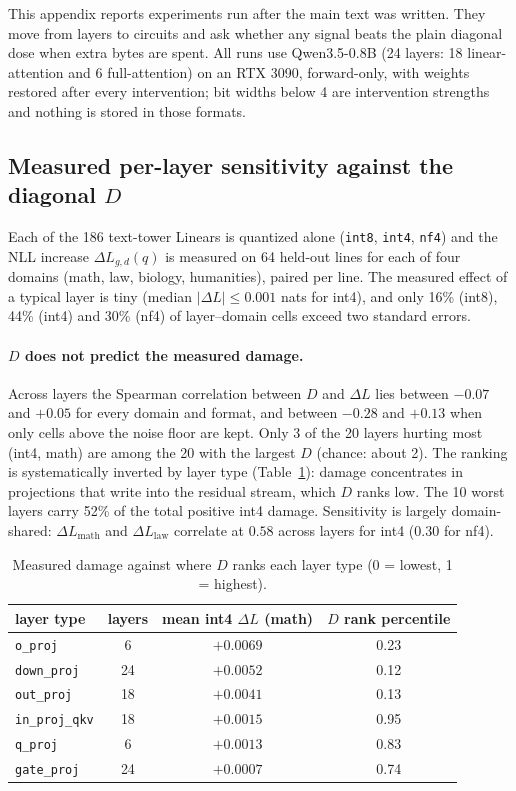 \documentclass[11pt]{article}
\newcommand{\code}[1]{\texttt{#1}}
\begin{document}
This appendix reports experiments run after the main text was written. They move from layers to circuits and ask
whether any signal beats the plain diagonal dose when extra bytes are spent. All runs use Qwen3.5-0.8B
(24 layers: 18 linear-attention and 6 full-attention) on an RTX 3090, forward-only, with weights restored after every
intervention; bit widths below 4 are intervention strengths and nothing is stored in those formats.

\subsection{Measured per-layer sensitivity against the diagonal $D$}
Each of the 186 text-tower Linears is quantized alone (\code{int8}, \code{int4}, \code{nf4}) and the NLL increase
$\Delta L_{g,d}(q)$ is measured on 64 held-out lines for each of four domains (math, law, biology, humanities), paired per line.
The measured effect of a typical layer is tiny (median $|\Delta L|\le 0.001$ nats for int4), and only 16\% (int8), 44\% (int4) and 30\% (nf4)
of layer--domain cells exceed two standard errors.

\paragraph{$D$ does not predict the measured damage.}
Across layers the Spearman correlation between $D$ and $\Delta L$ lies between $-0.07$ and $+0.05$ for every
domain and format, and between $-0.28$ and $+0.13$ when only cells above the noise floor are kept. Only 3 of the 20 layers
hurting most (int4, math) are among the 20 with the largest $D$ (chance: about 2). The ranking is systematically inverted by layer type
(Table~\ref{tab:layertype}): damage concentrates in projections that write into the residual stream, which $D$ ranks low.
The 10 worst layers carry 52\% of the total positive int4 damage. Sensitivity is largely domain-shared: $\Delta L_{\text{math}}$ and
$\Delta L_{\text{law}}$ correlate at $0.58$ across layers for int4 ($0.30$ for nf4).
\begin{table}[h]
\centering\small
\begin{tabular}{lccc}
\toprule
layer type & layers & mean int4 $\Delta L$ (math) & $D$ rank percentile\\
\midrule
\code{o\_proj} & 6 & $+0.0069$ & 0.23\\
\code{down\_proj} & 24 & $+0.0052$ & 0.12\\
\code{out\_proj} & 18 & $+0.0041$ & 0.13\\
\code{in\_proj\_qkv} & 18 & $+0.0015$ & 0.95\\
\code{q\_proj} & 6 & $+0.0013$ & 0.83\\
\code{gate\_proj} & 24 & $+0.0007$ & 0.74\\
\bottomrule
\end{tabular}
\caption{Measured damage against where $D$ ranks each layer type (0 = lowest, 1 = highest).}
\label{tab:layertype}
\end{table}
\end{document}
